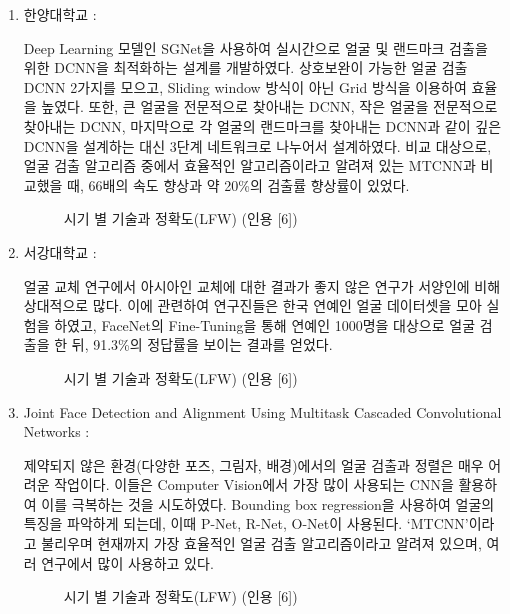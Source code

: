 \begin{enumerate}%
    \item 한양대학교 :

    Deep Learning 모델인 SGNet을 사용하여 실시간으로 얼굴 및 랜드마크 검출을 위한 DCNN을 최적화하는 설계를 개발하였다. 
    상호보완이 가능한 얼굴 검출 DCNN 2가지를 모으고, Sliding window 방식이 아닌 Grid 방식을 이용하여 효율을 높였다. 
    또한, 큰 얼굴을 전문적으로 찾아내는 DCNN, 작은 얼굴을 전문적으로 찾아내는 DCNN, 마지막으로 각 얼굴의 랜드마크를 찾아내는 DCNN과
    같이 깊은 DCNN을 설계하는 대신 3단계 네트워크로 나누어서 설계하였다. 비교 대상으로, 
    얼굴 검출 알고리즘 중에서 효율적인 알고리즘이라고 알려져 있는 MTCNN과 비교했을 때, 66배의 속도 향상과 약 20\%의 검출률 향상률이 있었다.

    \begin{figure}[h!]
        \centering
        \caption{시기 별 기술과 정확도(LFW) (인용 [6])    }
    \end{figure}

    \item 서강대학교 : 

    얼굴 교체 연구에서 아시아인 교체에 대한 결과가 좋지 않은 연구가 서양인에 비해 상대적으로 많다.
    이에 관련하여 연구진들은 한국 연예인 얼굴 데이터셋을 모아 실험을 하였고, 
    FaceNet의 Fine-Tuning을 통해 연예인 1000명을 대상으로 얼굴 검출을 한 뒤, 
    91.3\%의 정답률을 보이는 결과를 얻었다.

    \begin{figure}[h!]
        \centering
        \caption{시기 별 기술과 정확도(LFW) (인용 [6])    }
    \end{figure}

    \item Joint Face Detection and Alignment Using Multitask Cascaded Convolutional Networks : 

    제약되지 않은 환경(다양한 포즈, 그림자, 배경)에서의 얼굴 검출과 정렬은 매우 어려운 작업이다. 
    이들은 Computer Vision에서 가장 많이 사용되는 CNN을 활용하여 이를 극복하는 것을 시도하였다.
    Bounding box regression을 사용하여 얼굴의 특징을 파악하게 되는데, 이때 P-Net, R-Net, O-Net이 사용된다.
    ‘MTCNN’이라고 불리우며 현재까지 가장 효율적인 얼굴 검출 알고리즘이라고 알려져 있으며, 여러 연구에서 많이 사용하고 있다. 

    \begin{figure}[h!]
        \centering
        \caption{ 시기 별 기술과 정확도(LFW) (인용 [6])    }
    \end{figure}


\end{enumerate}
